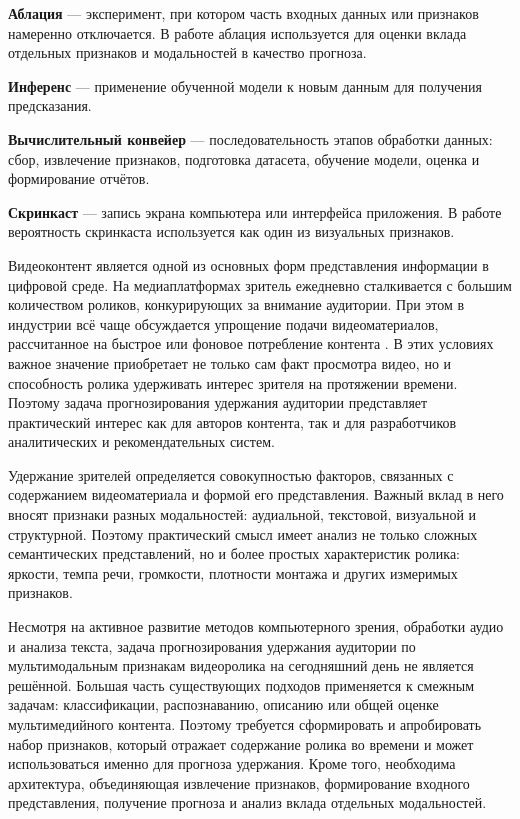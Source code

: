 \documentclass[times]{itmo-student-thesis}
\begin{document}
\textbf{Аблация} — эксперимент, при котором часть входных данных или признаков намеренно отключается. В работе аблация используется для оценки вклада отдельных признаков и модальностей в качество прогноза.

\textbf{Инференс} — применение обученной модели к новым данным для получения предсказания.

\textbf{Вычислительный конвейер} — последовательность этапов обработки данных: сбор, извлечение признаков, подготовка датасета, обучение модели, оценка и формирование отчётов.

\textbf{Скринкаст} — запись экрана компьютера или интерфейса приложения. В работе вероятность скринкаста используется как один из визуальных признаков.

\startprefacepage

Видеоконтент является одной из основных форм представления информации в цифровой среде. На медиаплатформах зритель ежедневно сталкивается с большим количеством роликов, конкурирующих за внимание аудитории. При этом в индустрии всё чаще обсуждается упрощение подачи видеоматериалов, рассчитанное на быстрое или фоновое потребление контента \cite{habr2024netflix}. В этих условиях важное значение приобретает не только сам факт просмотра видео, но и способность ролика удерживать интерес зрителя на протяжении времени. Поэтому задача прогнозирования удержания аудитории представляет практический интерес как для авторов контента, так и для разработчиков аналитических и рекомендательных систем.

Удержание зрителей определяется совокупностью факторов, связанных с содержанием видеоматериала и формой его представления. Важный вклад в него вносят признаки разных модальностей: аудиальной, текстовой, визуальной и структурной. Поэтому практический смысл имеет анализ не только сложных семантических представлений, но и более простых характеристик ролика: яркости, темпа речи, громкости, плотности монтажа и других измеримых признаков.

Несмотря на активное развитие методов компьютерного зрения, обработки аудио и анализа текста, задача прогнозирования удержания аудитории по мультимодальным признакам видеоролика на сегодняшний день не является решённой. Большая часть существующих подходов применяется к смежным задачам: классификации, распознаванию, описанию или общей оценке мультимедийного контента. Поэтому требуется сформировать и апробировать набор признаков, который отражает содержание ролика во времени и может использоваться именно для прогноза удержания. Кроме того, необходима архитектура, объединяющая извлечение признаков, формирование входного представления, получение прогноза и анализ вклада отдельных модальностей.
\end{document}
